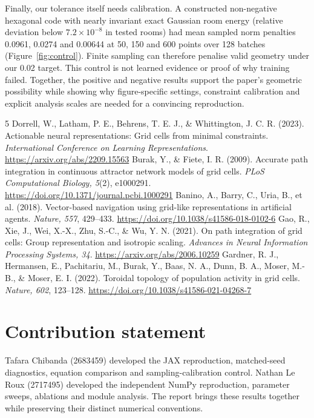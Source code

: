 \documentclass[10pt,letterpaper]{article}
\begin{document}
Finally, our tolerance itself needs calibration. A constructed non-negative hexagonal code with nearly invariant exact Gaussian room energy (relative deviation below $7.2\times10^{-8}$ in tested rooms) had mean sampled norm penalties 0.0961, 0.0274 and 0.00644 at 50, 150 and 600 points over 128 batches (Figure~\ref{fig:control}). Finite sampling can therefore penalise valid geometry under our 0.02 target. This control is not learned evidence or proof of why training failed. Together, the positive and negative results support the paper's geometric possibility while showing why figure-specific settings, constraint calibration and explicit analysis scales are needed for a convincing reproduction.

\begin{thebibliography}{5}
Dorrell, W., Latham, P. E., Behrens, T. E. J., \& Whittington, J. C. R. (2023).
Actionable neural representations: Grid cells from minimal constraints.
\emph{International Conference on Learning Representations}.
\url{https://arxiv.org/abs/2209.15563}
Burak, Y., \& Fiete, I. R. (2009).
Accurate path integration in continuous attractor network models of grid cells.
\emph{PLoS Computational Biology, 5}(2), e1000291.
\url{https://doi.org/10.1371/journal.pcbi.1000291}
Banino, A., Barry, C., Uria, B., et al. (2018).
Vector-based navigation using grid-like representations in artificial agents.
\emph{Nature, 557}, 429--433.
\url{https://doi.org/10.1038/s41586-018-0102-6}
Gao, R., Xie, J., Wei, X.-X., Zhu, S.-C., \& Wu, Y. N. (2021).
On path integration of grid cells: Group representation and isotropic scaling.
\emph{Advances in Neural Information Processing Systems, 34}.
\url{https://arxiv.org/abs/2006.10259}
Gardner, R. J., Hermansen, E., Pachitariu, M., Burak, Y., Baas, N. A., Dunn, B. A., Moser, M.-B., \& Moser, E. I. (2022).
Toroidal topology of population activity in grid cells.
\emph{Nature, 602}, 123--128.
\url{https://doi.org/10.1038/s41586-021-04268-7}
\end{thebibliography}

\section{Contribution statement}
Tafara Chibanda (2683459) developed the JAX reproduction, matched-seed diagnostics, equation comparison and sampling-calibration control. Nathan Le Roux (2717495) developed the independent NumPy reproduction, parameter sweeps, ablations and module analysis. The report brings these results together while preserving their distinct numerical conventions.
\end{document}
